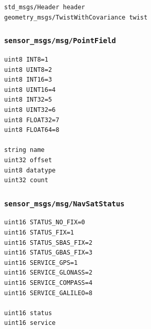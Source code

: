 \documentclass[
]{article}
\begin{document}
\begin{verbatim}
std_msgs/Header header
geometry_msgs/TwistWithCovariance twist
\end{verbatim}

\subsubsection{\texorpdfstring{\texttt{sensor\_msgs/msg/PointField}}{sensor\_msgs/msg/PointField}}\label{sensor_msgsmsgpointfield}

\begin{verbatim}
uint8 INT8=1
uint8 UINT8=2
uint8 INT16=3
uint8 UINT16=4
uint8 INT32=5
uint8 UINT32=6
uint8 FLOAT32=7
uint8 FLOAT64=8

string name
uint32 offset
uint8 datatype
uint32 count
\end{verbatim}

\subsubsection{\texorpdfstring{\texttt{sensor\_msgs/msg/NavSatStatus}}{sensor\_msgs/msg/NavSatStatus}}\label{sensor_msgsmsgnavsatstatus}

\begin{verbatim}
uint16 STATUS_NO_FIX=0
uint16 STATUS_FIX=1
uint16 STATUS_SBAS_FIX=2
uint16 STATUS_GBAS_FIX=3
uint16 SERVICE_GPS=1
uint16 SERVICE_GLONASS=2
uint16 SERVICE_COMPASS=4
uint16 SERVICE_GALILEO=8

uint16 status
uint16 service
\end{verbatim}
\end{document}
